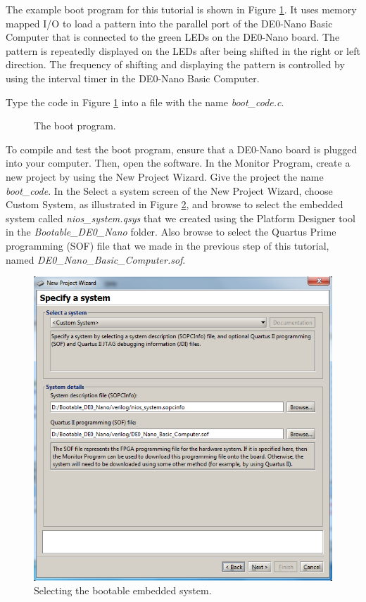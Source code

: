 \documentclass[11pt, twoside, pdftex]{article}
\begin{document}
The example boot program for this tutorial is shown in Figure \ref{fig:boot_code}.
It uses memory mapped I/O to load a pattern into the parallel port of the DE0-Nano Basic
Computer that is connected to the green LEDs on the DE0-Nano board. The pattern is
repeatedly displayed on the LEDs after being shifted in the right or left direction. The
frequency of shifting and displaying the pattern is controlled by using the interval timer 
in the DE0-Nano Basic Computer. 

Type the code in Figure \ref{fig:boot_code} into a file with the name {\it boot\_code.c}.

\begin{figure}[!h]

\caption{The boot program.}
\label{fig:boot_code}
\end{figure}

\clearpage
\newpage

To compile and test the boot program, ensure that a DE0-Nano board is plugged into your
computer. Then, open the \productNameMed{} software. 
In the Monitor Program, create a new project by using the New Project Wizard.  Give the
project the name {\it boot\_code}. In the {\sf Select a system} 
screen of the New Project Wizard, choose {\sf Custom System}, as
illustrated in Figure \ref{fig:select_system}, and browse to select the embedded 
system called {\it nios\_system.qsys} that we created using the Platform Designer tool
in the {\it Bootable\_DE0\_Nano} folder. Also browse to select the {\sf Quartus Prime programming
(SOF) file} that we made in the previous step of this tutorial, 
named {\it DE0\_Nano\_Basic\_Computer.sof}. 

\begin{figure}[H]
   \begin{center}
        \includegraphics[scale=.65]{figures/select_system.png}
   \end{center}
   \caption{Selecting the bootable embedded system.}
	\label{fig:select_system}
\end{figure}
\end{document}
